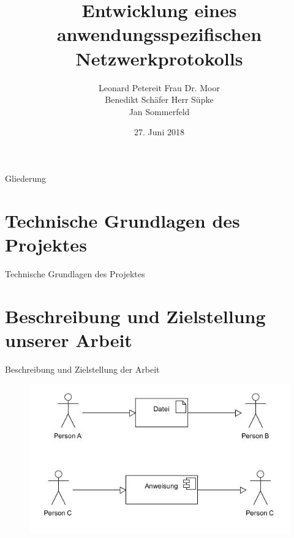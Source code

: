\documentclass{beamer}
\title[]{Entwicklung eines anwendungsspezifischen Netzwerkprotokolls}
\author{Leonard Petereit\hfill \hspace{0.5cm} Frau Dr. Moor\\ Benedikt Schäfer\hfill \hspace{1cm} Herr Süpke \\ Jan Sommerfeld \hspace{4.25cm} }
\institute{Albert-Schweitzer Gymnasium Erfurt - Spezialschulteil}
\date{27. Juni 2018}
\begin{document}
\begin{frame}
	
  \titlepage
\end{frame}

\begin{frame}{Gliederung}

  \tableofcontents
\end{frame}




\section{Technische Grundlagen des Projektes}

\begin{frame}{Technische Grundlagen des Projektes}

\end{frame}

\section{Beschreibung und Zielstellung unserer Arbeit}

\begin{frame}{Beschreibung und Zielstellung der Arbeit}
\begin{figure}
\includegraphics[width=\textwidth]{s1.jpg}

\end{figure}
\end{frame}
\end{document}
